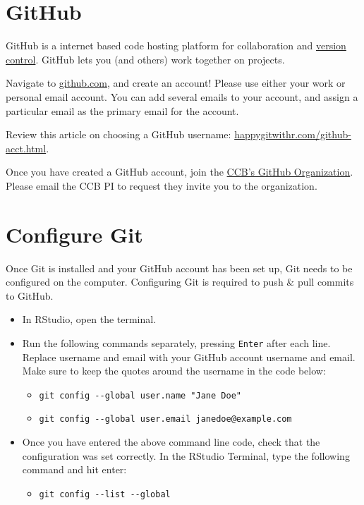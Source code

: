 \documentclass[
]{book}
\providecommand{\tightlist}{%
  \setlength{\itemsep}{0pt}\setlength{\parskip}{0pt}}
\begin{document}
\hypertarget{github}{%
\section{GitHub}\label{github}}

GitHub is a internet based code hosting platform for collaboration and \href{https://www.atlassian.com/git/tutorials/what-is-version-control\#:~:text=Version\%20control\%2C\%20also\%20known\%20as,to\%20source\%20code\%20over\%20time.}{version control}. GitHub lets you (and others) work together on projects.

Navigate to \href{https://github.com/}{github.com}, and create an account! Please use either your work or personal email account. You can add several emails to your account, and assign a particular email as the primary email for the account.

Review this article on choosing a GitHub username: \url{happygitwithr.com/github-acct.html}.

Once you have created a GitHub account, join the \href{https://github.com/ccbucr}{CCB's GitHub Organization}. Please email the CCB PI to request they invite you to the organization.

\hypertarget{configure-git}{%
\section{Configure Git}\label{configure-git}}

Once Git is installed and your GitHub account has been set up, Git needs to be configured on the computer. Configuring Git is required to push \& pull commits to GitHub.

\begin{itemize}
\item
  In RStudio, open the terminal.
\item
  Run the following commands separately, pressing \texttt{Enter} after each line. Replace username and email with your GitHub account username and email. Make sure to keep the quotes around the username in the code below:

  \begin{itemize}
  \tightlist
  \item
    \texttt{git\ config\ -\/-global\ user.name\ "Jane\ Doe"}
  \item
    \texttt{git\ config\ -\/-global\ user.email\ janedoe@example.com}
  \end{itemize}
\item
  Once you have entered the above command line code, check that the configuration was set correctly. In the RStudio Terminal, type the following command and hit enter:

  \begin{itemize}
  \tightlist
  \item
    \texttt{git\ config\ -\/-list\ -\/-global}
  \end{itemize}
\end{itemize}
\end{document}
